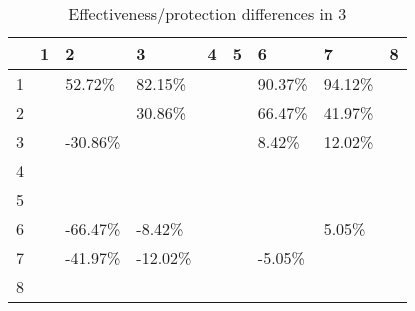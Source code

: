 \begin{table}[ht]
\centering
\begin{tabular}{rllllllll}
  \hline
 & 1 & 2 & 3 & 4 & 5 & 6 & 7 & 8 \\ 
  \hline
1 &  & 52.72\% & 82.15\% &  &  & 90.37\% & 94.12\% &  \\ 
  2 &  &  & 30.86\% &  &  & 66.47\% & 41.97\% &  \\ 
  3 &  & -30.86\% &  &  &  & 8.42\% & 12.02\% &  \\ 
  4 &  &  &  &  &  &  &  &  \\ 
  5 &  &  &  &  &  &  &  &  \\ 
  6 &  & -66.47\% & -8.42\% &  &  &  & 5.05\% &  \\ 
  7 &  & -41.97\% & -12.02\% &  &  & -5.05\% &  &  \\ 
  8 &  &  &  &  &  &  &  &  \\ 
   \hline
\end{tabular}
\caption{Effectiveness/protection differences in  3} 
\end{table}
